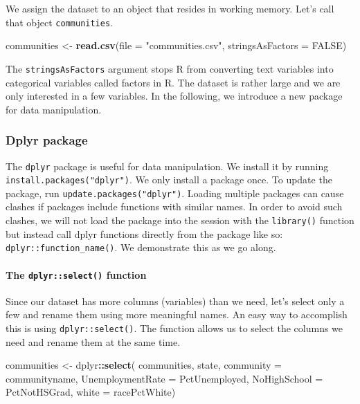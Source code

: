 \documentclass[]{article}
\newenvironment{Shaded}{\begin{snugshade}}{\end{snugshade}}
\newcommand{\DataTypeTok}[1]{\textcolor[rgb]{0.13,0.29,0.53}{#1}}
\newcommand{\KeywordTok}[1]{\textcolor[rgb]{0.13,0.29,0.53}{\textbf{#1}}}
\newcommand{\NormalTok}[1]{#1}
\newcommand{\OperatorTok}[1]{\textcolor[rgb]{0.81,0.36,0.00}{\textbf{#1}}}
\newcommand{\OtherTok}[1]{\textcolor[rgb]{0.56,0.35,0.01}{#1}}
\newcommand{\StringTok}[1]{\textcolor[rgb]{0.31,0.60,0.02}{#1}}
\let\oldparagraph\paragraph
\renewcommand{\paragraph}[1]{\oldparagraph{#1}\mbox{}}
\begin{document}
We assign the dataset to an object that resides in working memory. Let's call that object \texttt{communities}.

\begin{Shaded}
\begin{Highlighting}[]
\NormalTok{communities <-}\StringTok{ }\KeywordTok{read.csv}\NormalTok{(}\DataTypeTok{file =} \StringTok{"communities.csv"}\NormalTok{, }\DataTypeTok{stringsAsFactors =} \OtherTok{FALSE}\NormalTok{)}
\end{Highlighting}
\end{Shaded}

The \texttt{stringsAsFactors} argument stops R from converting text variables into categorical variables called factors in R. The dataset is rather large and we are only interested in a few variables. In the following, we introduce a new package for data manipulation.

\hypertarget{dplyr-package}{%
\subsubsection{Dplyr package}\label{dplyr-package}}

The \texttt{dplyr} package is useful for data manipulation. We install it by running \texttt{install.packages("dplyr")}. We only install a package once. To update the package, run \texttt{update.packages("dplyr")}. Loading multiple packages can cause clashes if packages include functions with similar names. In order to avoid such clashes, we will not load the package into the session with the \texttt{library()} function but instead call dplyr functions directly from the package like so: \texttt{dplyr::function\_name()}. We demonstrate this as we go along.

\hypertarget{the-dplyrselect-function}{%
\paragraph{\texorpdfstring{The \texttt{dplyr::select()} function}{The dplyr::select() function}}\label{the-dplyrselect-function}}

Since our dataset has more columns (variables) than we need, let's select only a few and rename them using more meaningful names. An easy way to accomplish this is using \texttt{dplyr::select()}. The function allows us to select the columns we need and rename them at the same time.

\begin{Shaded}
\begin{Highlighting}[]
\NormalTok{communities <-}\StringTok{ }\NormalTok{dplyr}\OperatorTok{::}\KeywordTok{select}\NormalTok{(}
\NormalTok{  communities, }
\NormalTok{  state, }
  \DataTypeTok{community =}\NormalTok{ communityname, }
  \DataTypeTok{UnemploymentRate =}\NormalTok{ PctUnemployed, }
  \DataTypeTok{NoHighSchool =}\NormalTok{ PctNotHSGrad,}
  \DataTypeTok{white =}\NormalTok{ racePctWhite)}
\end{Highlighting}
\end{Shaded}
\end{document}
